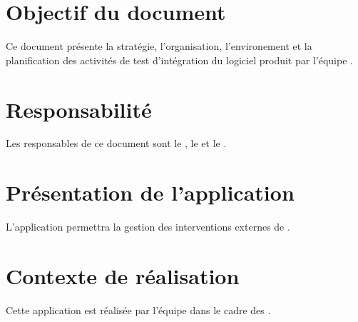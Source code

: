 \section*{Objectif du document}
	Ce document présente la stratégie, l'organisation, l'environement et la planification des activités de test d'intégration du logiciel produit par l'équipe \nomEquipe{}.
	
\section*{Responsabilité}
	Les responsables de ce document sont le \CP, le \RQ{} et le \RD.
	
\section*{Présentation de l'application}
	L'application permettra la gestion des interventions externes de \nomClient.
	
\section*{Contexte de réalisation}
	Cette application est réalisée par l'équipe \nomEquipe{} dans le cadre des \PIC.

